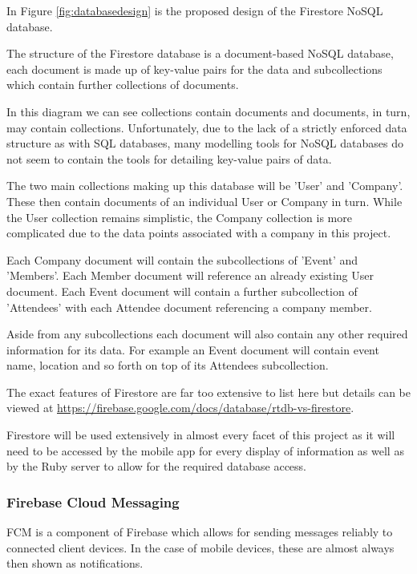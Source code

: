 In Figure \ref{fig:databasedesign} is the proposed design of the Firestore NoSQL database. 

The structure of the Firestore database is a document-based NoSQL database, each document is made up of key-value pairs for the data and subcollections which contain further collections of documents. 

In this diagram we can see collections contain documents and documents, in turn, may contain collections. Unfortunately, due to the lack of a strictly enforced data structure as with SQL databases, many modelling tools for NoSQL databases do not seem to contain the tools for detailing key-value pairs of data.

The two main collections making up this database will be 'User' and 'Company'. These then contain documents of an individual User or Company in turn. While the User collection remains simplistic, the Company collection is more complicated due to the data points associated with a company in this project. 

Each Company document will contain the subcollections of 'Event' and 'Members'. Each Member document will reference an already existing User document. Each Event document will contain a further subcollection of 'Attendees' with each Attendee document referencing a company member.

Aside from any subcollections each document will also contain any other required information for its data. For example an Event document will contain event name, location and so forth on top of its Attendees subcollection. 

The exact features of Firestore are far too extensive to list here but details can be viewed at \url{https://firebase.google.com/docs/database/rtdb-vs-firestore}.

Firestore will be used extensively in almost every facet of this project as it will need to be accessed by the mobile app for every display of information as well as by the Ruby server to allow for the required database access.

\subsubsection{Firebase Cloud Messaging}

FCM is a component of Firebase which allows for sending messages reliably to connected client devices. In the case of mobile devices, these are almost always then shown as notifications.

